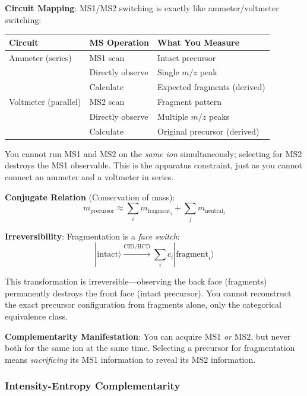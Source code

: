 \documentclass[twocolumn,10pt,a4paper]{article}
\theoremstyle{definition}
\theoremstyle{remark}
\begin{document}
\textbf{Circuit Mapping}: MS1/MS2 switching is exactly like ammeter/voltmeter switching:
\begin{center}
\begin{tabular}{lll}
\toprule
Circuit & MS Operation & What You Measure \\
\midrule
Ammeter (series) & MS1 scan & Intact precursor \\
& Directly observe & Single $m/z$ peak \\
& Calculate & Expected fragments (derived) \\
\midrule
Voltmeter (parallel) & MS2 scan & Fragment pattern \\
& Directly observe & Multiple $m/z$ peaks \\
& Calculate & Original precursor (derived) \\
\bottomrule
\end{tabular}
\end{center}

You cannot run MS1 and MS2 on the \emph{same ion} simultaneously; selecting for MS2 destroys the MS1 observable. This is the apparatus constraint, just as you cannot connect an ammeter and a voltmeter in series.

\textbf{Conjugate Relation} (Conservation of mass):
\begin{equation}
m_{\text{precursor}} \approx \sum_{i} m_{\text{fragment}_i} + \sum_{j} m_{\text{neutral}_j}
\end{equation}

\textbf{Irreversibility}: Fragmentation is a \emph{face switch}:
\begin{equation}
|\text{intact}\rangle \xrightarrow{\text{CID/HCD}} \sum_i c_i |\text{fragment}_i\rangle
\end{equation}

This transformation is irreversible—observing the back face (fragments) permanently destroys the front face (intact precursor). You cannot reconstruct the exact precursor configuration from fragments alone, only the categorical equivalence class.

\textbf{Complementarity Manifestation}: You can acquire MS1 \emph{or} MS2, but never both for the same ion at the same time. Selecting a precursor for fragmentation means \emph{sacrificing} its MS1 information to reveal its MS2 information.

\subsubsection{Intensity-Entropy Complementarity}
\end{document}
